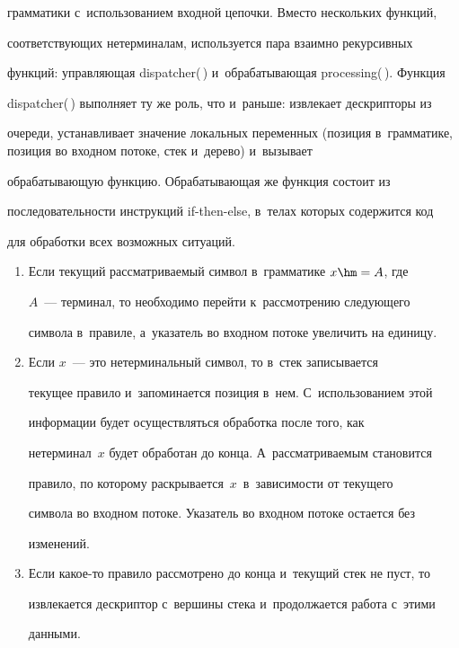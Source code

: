 грамматики с~использованием входной цепочки. Вместо нескольких функций,


соответствующих нетерминалам, используется пара взаимно рекурсивных


функций: управляющая dispatcher(\,) и~обрабатывающая processing(\,). Функция


dispatcher(\,) выполняет ту же роль, что и~раньше: извлекает дескрипторы из


очереди, устанавливает значение локальных переменных (позиция в~грамматике, позиция во входном потоке, стек и~дерево) и~вызывает


обрабатывающую функцию. Обрабатывающая же функция состоит из


последовательности инструкций if-then-else, в~телах которых содержится код


для обработки всех возможных ситуаций.


\begin{enumerate}[1.]


\item Если текущий рассматриваемый символ в~грамматике $x \hm= A$, где


$A$~--- терминал, то необходимо перейти к~рассмотрению следующего


символа в~правиле, а~указатель во входном потоке увеличить на единицу.


\item Если $x$~--- это нетерминальный символ, то в~стек записывается


текущее правило и~запоминается позиция в~нем. С~использованием этой


информации будет осуществляться обработка после того, как


нетерминал~$x$ будет обработан до конца. А~рассматриваемым становится


правило, по которому раскрывается~$x$~в~зависимости от текущего


символа во входном потоке. Указатель во входном потоке остается без


изменений.


\item Если какое-то правило рассмотрено до конца и~текущий стек не пуст, то


извлекается дескриптор с~вершины стека и~продолжается работа с~этими


данными.


\end{enumerate}





